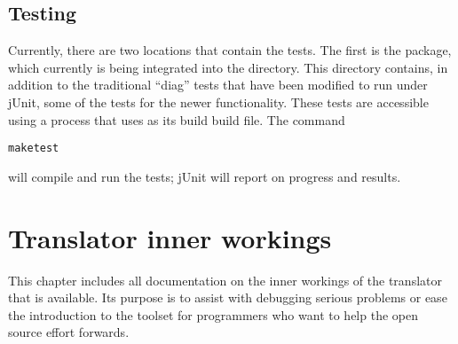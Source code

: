 \section{Testing}
Currently, there are two locations that contain the tests. The first
is the  package, which currently is
being integrated into the  directory. This
directory contains, in addition to the traditional ``diag'' tests that
have been modified to run under jUnit, some of the tests for the newer
functionality. These tests are accessible using a 
process that uses  as its build build file. The
command
\begin{alltt}
make test
\end{alltt}
will compile and run the tests; jUnit will report on progress and
results.
\chapter{Translator inner workings}
This chapter includes all documentation on the inner workings of the
translator that is available. Its purpose is to assist with debugging
serious problems or ease the introduction to the toolset for
programmers who want to help the open source effort forwards.
